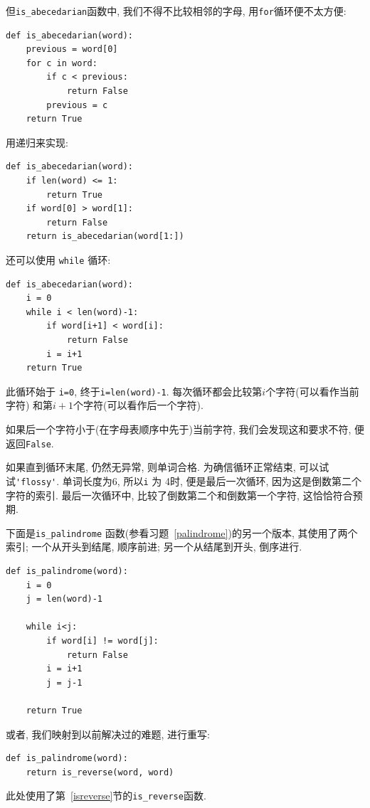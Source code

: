 \documentclass[10pt]{book}
\begin{document}
但\verb"is_abecedarian"函数中, 我们不得不比较相邻的字母, 
用{\tt for}循环便不太方便:

\begin{verbatim}
def is_abecedarian(word):
    previous = word[0]
    for c in word:
        if c < previous:
            return False
        previous = c
    return True
\end{verbatim}

用递归来实现:

\begin{verbatim}
def is_abecedarian(word):
    if len(word) <= 1:
        return True
    if word[0] > word[1]:
        return False
    return is_abecedarian(word[1:])
\end{verbatim}

还可以使用 {\tt while} 循环:

\begin{verbatim}
def is_abecedarian(word):
    i = 0
    while i < len(word)-1:
        if word[i+1] < word[i]:
            return False
        i = i+1
    return True
\end{verbatim}
%
此循环始于 {\tt i=0}, 终于{\tt i=len(word)-1}. 
每次循环都会比较第$i$个字符(可以看作当前字符)
和第$i+1$个字符(可以看作后一个字符). 

如果后一个字符小于(在字母表顺序中先于)当前字符, 
我们会发现这和要求不符, 便返回{\tt False}.

如果直到循环末尾, 仍然无异常, 则单词合格. 
为确信循环正常结束, 可以试试\verb"'flossy'". 
单词长度为6, 所以{\tt i} 为 4时, 便是最后一次循环, 
因为这是倒数第二个字符的索引. 最后一次循环中, 
比较了倒数第二个和倒数第一个字符, 这恰恰符合预期. 

下面是\verb"is_palindrome" 函数(参看习题~\ref{palindrome})的另一个版本, 
其使用了两个索引; 一个从开头到结尾, 顺序前进;
另一个从结尾到开头, 倒序进行.

\begin{verbatim}
def is_palindrome(word):
    i = 0
    j = len(word)-1

    while i<j:
        if word[i] != word[j]:
            return False
        i = i+1
        j = j-1

    return True
\end{verbatim}

或者, 我们映射到以前解决过的难题, 进行重写:

\begin{verbatim}
def is_palindrome(word):
    return is_reverse(word, word)
\end{verbatim}
%
此处使用了第~\ref{isreverse}节的\verb"is_reverse"函数.
\end{document}
